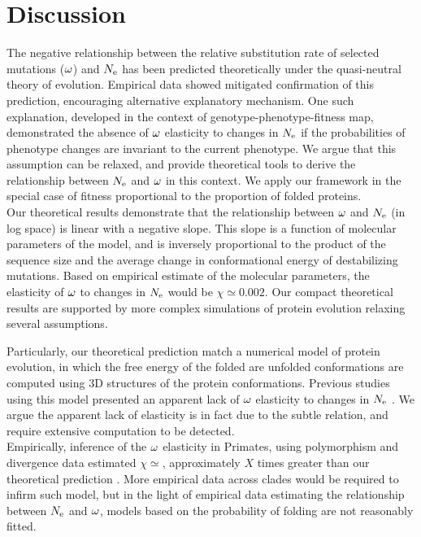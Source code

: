 \documentclass{article}
\begin{document}
	
	
	\section*{Discussion}
	The negative relationship between the relative substitution rate of selected mutations ($\omega$) and $N_{\mathrm{e}}$ has been predicted theoretically under the quasi-neutral theory of evolution.
	Empirical data showed mitigated confirmation of this prediction, encouraging alternative explanatory mechanism.
	One such explanation, developed in the context of genotype-phenotype-fitness map, demonstrated the absence of $\omega$ elasticity to changes in $N_{\mathrm{e}}$ if the probabilities of phenotype changes are invariant to the current phenotype.
	We argue that this assumption can be relaxed, and provide theoretical tools to derive the relationship between $N_{\mathrm{e}}$ and $\omega$ in this context.
	We apply our framework in the special case of fitness proportional to the proportion of folded proteins. \\
	
	Our theoretical results demonstrate that the relationship between $\omega$ and $N_{\mathrm{e}}$ (in log space) is linear with a negative slope.
	This slope is a function of molecular parameters of the model, and is inversely proportional to the product of the sequence size and the average change in conformational energy of destabilizing mutations. 
	Based on empirical estimate of the molecular parameters, the elasticity of $\omega$ to changes in $N_{\mathrm{e}}$ would be $\chi \simeq 0.002$.
	Our compact theoretical results are supported by more complex simulations of protein evolution relaxing several assumptions.
	
	Particularly, our theoretical prediction match a numerical model of protein evolution, in which the free energy of the folded are unfolded conformations are computed using $3$D structures of the protein conformations.
	Previous studies using this model presented an apparent lack of $\omega$ elasticity to changes in $N_{\mathrm{e}}$ \cite{Goldstein2013}.
	We argue the apparent lack of elasticity is in fact due to the subtle relation, and require extensive computation to be detected.\\
	
	Empirically, inference of the $\omega$ elasticity in Primates, using polymorphism and divergence data estimated $\chi \simeq $, approximately $X$ times greater than our theoretical prediction \cite{Brevet2019}.
	More empirical data across clades would be required to infirm such model, but in the light of empirical data estimating the relationship between $N_{\mathrm{e}}$ and $\omega$, models based on the probability of folding are not reasonably fitted.\\
	
\end{document}

